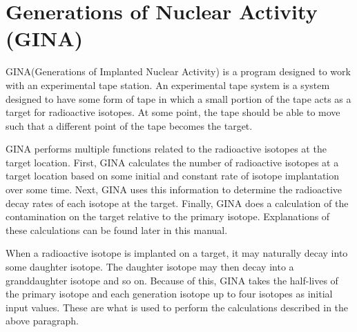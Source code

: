 \chapter{Generations of Nuclear Activity (GINA)}

GINA(Generations of Implanted Nuclear Activity) is a program designed to work with an experimental tape station. An experimental tape system is a system designed to have some form of tape in which a small portion of the tape acts as a target for radioactive isotopes. At some point, the tape should be able to move such that a different point of the tape becomes the target. 

GINA performs multiple functions related to the radioactive isotopes at the target location. First, GINA calculates the number of radioactive isotopes at a target location based on some initial and constant rate of isotope implantation over some time. Next, GINA uses this information to determine the radioactive decay rates of each isotope at the target. Finally, GINA does a calculation of the contamination on the target relative to the primary isotope. Explanations of these calculations can be found later in this manual.

When a radioactive isotope is implanted on a target, it may naturally decay into some daughter isotope. The daughter isotope may then decay into a granddaughter isotope and so on. Because of this, GINA takes the half-lives of the primary isotope and each generation isotope up to four isotopes as initial input values. These are what is used to perform the calculations described in the above paragraph.

